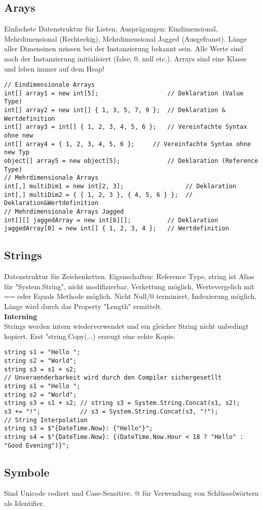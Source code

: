 \subsection{Arays}
Einfachste Datenstruktur für Listen, Ausprägungen: Eindimensional, Mehrdimensional (Rechteckig), Mehrdimensional Jagged (Ausgefranst). Länge aller Dimensinen müssen bei der Instanzierung bekannt sein. Alle Werte sind nach der Instanzierung initialisiert (false, 0, null etc.). Arrays sind eine Klasse und leben immer auf dem Heap!

\begin{lstlisting}
// Eindimensionale Arrays
int[] array1 = new int[5];                   // Deklaration (Value Type)
int[] array2 = new int[] { 1, 3, 5, 7, 9 };  // Deklaration & Wertdefinition
int[] array3 = int[] { 1, 2, 3, 4, 5, 6 };   // Vereinfachte Syntax ohne new
int[] array4 = { 1, 2, 3, 4, 5, 6 };     // Vereinfachte Syntax ohne new Typ
object[] array5 = new object[5];             // Deklaration (Reference Type)
// Mehrdimensionale Arrays
int[,] multiDim1 = new int[2, 3];                 // Deklaration
int[,] multiDim2 = { { 1, 2, 3 }, { 4, 5, 6 } };  // Deklaration&Wertdefinition
// Mehrdimensionale Arrays Jagged
int[][] jaggedArray = new int[6][];          // Deklaration
jaggedArray[0] = new int[] { 1, 2, 3, 4 };   // Wertdefinition
\end{lstlisting}

\subsection{Strings}
Datenstruktur für Zeichenketten. Eigenschaften: Reference Type, string ist Alias für "System.String", nicht modifizierbar, Verkettung möglich, Wertevergelich mit == oder Equals Methode möglich. Nicht Null/0 terminiert, Indexierung möglich, Länge wird durch das Property "Length" ermittelt.\\
\textbf{Interning} \\
Strings werden intern wiederverwendet und ein gleicher String nicht unbedingt kopiert. Erst "string.Copy(...) erzeugt eine echte Kopie.
\begin{lstlisting}
string s1 = "Hello ";
string s2 = "World";
string s3 = s1 + s2;
// Unveraenderbarkeit wird durch den Compiler sichergesetllt
string s1 = "Hello ";
string s2 = "World";
string s3 = s1 + s2; // string s3 = System.String.Concat(s1, s2); 
s3 += "!";           // s3 = System.String.Concat(s3, "!"); 
// String Interpolation
string s3 = $"{DateTime.Now}: {"Hello"}";
string s4 = $"{DateTime.Now}: {(DateTime.Now.Hour < 18 ? "Hello" : "Good Evening")}";
\end{lstlisting}

\subsection{Symbole}
Sind Unicode codiert und Case-Sensitive. @ für Verwendung von Schlüsselwörtern als Identifier. 


\pagebreak



